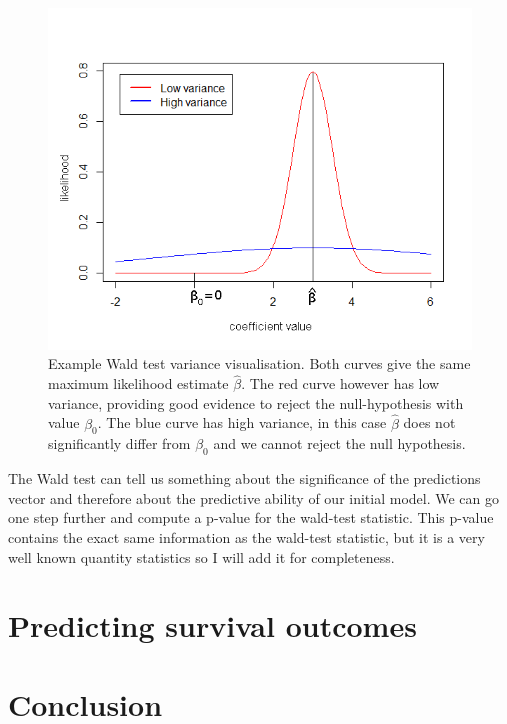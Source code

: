 \begin{figure}
	\centering
	\includegraphics[scale=.7]{images/wald_test}
	\caption{Example Wald test variance visualisation. Both curves give the same maximum likelihood estimate $\hat{\beta}$. The red curve however has low variance, providing good evidence to reject the null-hypothesis with value $\beta_{0}$. The blue curve has high variance, in this case $\hat{\beta}$ does not significantly differ from $\beta_{0}$ and we cannot reject the null hypothesis.}
	\label{fig:evaluation-wald-test}
\end{figure}
The Wald test can tell us something about the significance of the predictions vector and therefore about the predictive ability of our initial model. We can go one step further and compute a p-value\cite{pvalue1}\cite{wikip} for the wald-test statistic. This p-value contains the exact same information as the wald-test statistic, but it is a very well known quantity statistics so I will add it for completeness.
\section{Predicting survival outcomes}
\label{sec:evaluation-predictingsurvival}

\section{Conclusion}
\label{sec:evaluation-conclusion}
